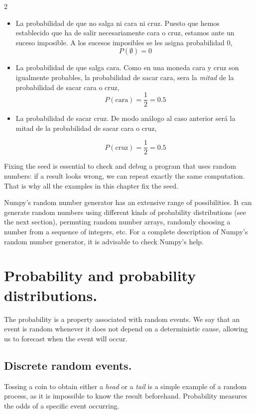 \begin{paracol}{2}
\begin{itemize}
\item La probabilidad de que no salga ni cara ni cruz. Puesto que hemos establecido que ha de salir necesariamente cara o cruz, estamos ante un suceso imposible. A los sucesos imposibles se les asigna probabilidad $0$,
\begin{equation*}
P(\emptyset) = 0
\end{equation*}

\item La probabilidad de que salga cara. Como en una moneda cara y cruz son igualmente probables,  la probabilidad de sacar cara, sera la \emph{mitad} de la probabilidad de sacar cara o cruz,
\begin{equation*}
P(\text{cara})=\frac{1}{2}=0.5
\end{equation*}

\item La probabilidad de sacar cruz. De modo análogo al caso anterior será la mitad de la probabilidad de sacar cara o cruz, 

\begin{equation*}
P(\text{cruz})=\frac{1}{2}=0.5
\end{equation*} 
\end{itemize}
\switchcolumn
Fixing the seed is essential to check and debug a program that uses random numbers: if a result looks wrong, we can repeat exactly the same computation. That is why all the examples in this chapter fix the seed.

Numpy's random number generator has an extensive range of possibilities. It can generate random numbers using different kinds of probability distributions (see the next section), permuting random number arrays, randomly choosing a number from a sequence of integers, etc. For a complete description of Numpy's random number generator, it is advisable to check Numpy's help. 

\section{Probability and probability distributions.}
The probability is a property associated with random events. We say that an event is random whenever it does not depend on a deterministic cause, allowing us to forecast when the event will occur.

\subsection{Discrete random events.}
Tossing a coin to obtain either a \emph{head} or a \emph{tail} is a simple example of a random process, as it is impossible to know the result beforehand. Probability measures the odds of a specific event occurring.


\end{paracol}
